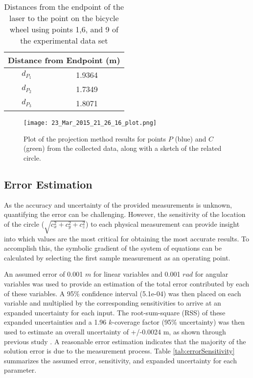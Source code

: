 \documentclass[12pt]{article}
\begin{document}
\begin{table}[ht!]
\begin{center}
\begin{tabular}{|c|c|}
\hline
\multicolumn{2}{|c|}{\textbf{Distance from Endpoint (m)}}  \\ \hline
$d_{P_1}$               & 1.9364  \\ \hline
$d_{P_2}$               & 1.7349  \\ \hline
$d_{P_3}$               & 1.8071  \\ \hline
\end{tabular}
\caption{Distances from the endpoint of the laser to the point on the bicycle wheel using points 1,6, and 9 of the experimental data set}
\label{tab:collected_data_distance_results}
\end{center}
\end{table}

\begin{figure}[!ht]
  {\texttt{[image: 23\_Mar\_2015\_21\_26\_16\_plot.png]}}
  \centering
  \caption{Plot of the projection method results for points $P$ (blue) and $C$ (green) from the collected data, along with a sketch of the related circle.}
  \centering
  \label{fig:results_proj2}
\end{figure}

\subsection{Error Estimation}

As the accuracy and uncertainty of the provided measurements is unknown, quantifying the error can be challenging.  However, the sensitivity of the location of the circle ($\sqrt{c_x^2+c_y^2+c_z^2}$) to each physical measurement can provide insight into which values are the most critical for obtaining the most accurate results. To accomplish this, the symbolic gradient of the system of equations can be calculated by selecting the first sample measurement as an operating point. 

An assumed error of 0.001 $m$ for linear variables and 0.001 $rad$ for angular variables was used to provide an estimation of the total error contributed by each of these variables.  A 95\% confidence interval (5.1e-04) was then placed on each variable and multiplied by the corresponding sensitivities to arrive at an expanded uncertainty for each input.  The root-sum-square (RSS) of these expanded uncertainties and a 1.96 $k$-coverage factor (95\% uncertainty) was then used to estimate an overall uncertainty of +/-0.0024 m, as shown through previous study \cite{GUM}. A reasonable error estimation indicates that the majority of the solution error is due to the measurement process.  Table \ref{tab:errorSensitivity} summarizes the assumed error, sensitivity, and expanded uncertainty for each parameter. 
 
\end{document}
